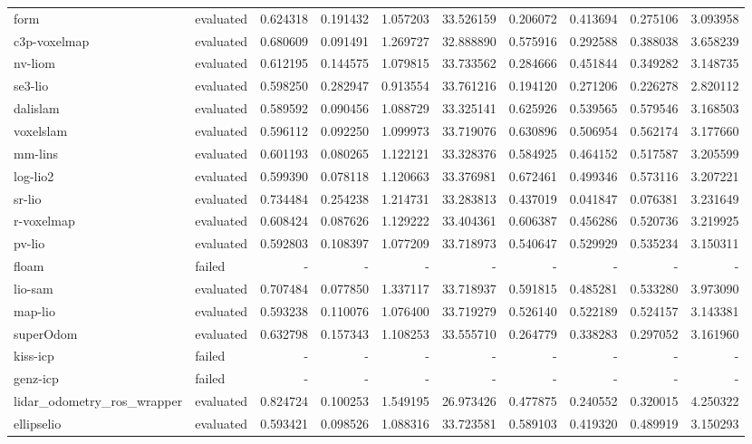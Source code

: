 \documentclass{article}
\begin{document}
\begin{table}[htbp]
\begin{tabular}{llrrrrrrrr}
form & evaluated & 0.624318 & 0.191432 & 1.057203 & 33.526159 & 0.206072 & 0.413694 & 0.275106 & 3.093958 \\
c3p-voxelmap & evaluated & 0.680609 & 0.091491 & 1.269727 & 32.888890 & 0.575916 & 0.292588 & 0.388038 & 3.658239 \\
nv-liom & evaluated & 0.612195 & 0.144575 & 1.079815 & 33.733562 & 0.284666 & 0.451844 & 0.349282 & 3.148735 \\
se3-lio & evaluated & 0.598250 & 0.282947 & 0.913554 & 33.761216 & 0.194120 & 0.271206 & 0.226278 & 2.820112 \\
dalislam & evaluated & 0.589592 & 0.090456 & 1.088729 & 33.325141 & 0.625926 & 0.539565 & 0.579546 & 3.168503 \\
voxelslam & evaluated & 0.596112 & 0.092250 & 1.099973 & 33.719076 & 0.630896 & 0.506954 & 0.562174 & 3.177660 \\
mm-lins & evaluated & 0.601193 & 0.080265 & 1.122121 & 33.328376 & 0.584925 & 0.464152 & 0.517587 & 3.205599 \\
log-lio2 & evaluated & 0.599390 & 0.078118 & 1.120663 & 33.376981 & 0.672461 & 0.499346 & 0.573116 & 3.207221 \\
sr-lio & evaluated & 0.734484 & 0.254238 & 1.214731 & 33.283813 & 0.437019 & 0.041847 & 0.076381 & 3.231649 \\
r-voxelmap & evaluated & 0.608424 & 0.087626 & 1.129222 & 33.404361 & 0.606387 & 0.456286 & 0.520736 & 3.219925 \\
pv-lio & evaluated & 0.592803 & 0.108397 & 1.077209 & 33.718973 & 0.540647 & 0.529929 & 0.535234 & 3.150311 \\
floam & failed & - & - & - & - & - & - & - & - \\
lio-sam & evaluated & 0.707484 & 0.077850 & 1.337117 & 33.718937 & 0.591815 & 0.485281 & 0.533280 & 3.973090 \\
map-lio & evaluated & 0.593238 & 0.110076 & 1.076400 & 33.719279 & 0.526140 & 0.522189 & 0.524157 & 3.143381 \\
superOdom & evaluated & 0.632798 & 0.157343 & 1.108253 & 33.555710 & 0.264779 & 0.338283 & 0.297052 & 3.161960 \\
kiss-icp & failed & - & - & - & - & - & - & - & - \\
genz-icp & failed & - & - & - & - & - & - & - & - \\
lidar\_odometry\_ros\_wrapper & evaluated & 0.824724 & 0.100253 & 1.549195 & 26.973426 & 0.477875 & 0.240552 & 0.320015 & 4.250322 \\
ellipselio & evaluated & 0.593421 & 0.098526 & 1.088316 & 33.723581 & 0.589103 & 0.419320 & 0.489919 & 3.150293 \\

\end{tabular}
\end{table}
\end{document}
